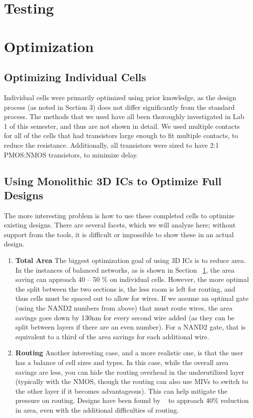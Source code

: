 \documentclass{article}
\begin{document}
\section{Testing}\label{sec:testing}

\section{Optimization}
\subsection{Optimizing Individual Cells}
Individual cells were primarily optimized using prior knowledge, as the design process (as noted in Section 3) does not differ significantly from the standard process. The methods that we used have all been thoroughly investigated in Lab 1 of this semester, and thus are not shown in detail. We used multiple contacts for all of the cells that had transistors large enough to fit multiple contacts, to reduce the resistance. Additionally, all transistors were sized to have 2:1 PMOS:NMOS transistors, to minimize delay. 

\subsection{Using Monolithic 3D ICs to Optimize Full Designs} The more interesting problem is how to use these completed cells to optimize existing designs. There are several facets, which we will analyze here; without support from the tools, it is difficult or impossible to show these in an actual design. 
\begin{enumerate}
	\item \textbf{Total Area} The biggest optimization goal of using 3D ICs is to reduce area. In the instances of balanced networks, as is shown in Section ~\ref{sec:testing}, the area saving can approach 40 -- 50 \% on individual cells. However, the more optimal the split between the two sections is, the less room is left for routing, and thus cells must be spaced out to allow for wires. If we assume an optimal gate (using the NAND2 numbers from above) that must route wires, the area savings goes down by 130nm for every second wire added (as they can be split between layers if there are an even number). For a NAND2 gate, that is equivalent to a third of the area savings for each additional wire. 
	\item \textbf{Routing} Another interesting case, and a more realistic one, is that the user has a balance of cell sizes and types. In this case, while the overall area savings are less, you can hide the routing overhead in the underutilized layer (typically with the NMOS, though the routing can also use MIVs to switch to the other layer if it becomes advantageous). This can help mitigate the pressure on routing. Designs have been found by ~\cite{ULTRA} to approach 40\% reduction in area, even with the additional difficulties of routing. 

\end{enumerate}
\end{document}
